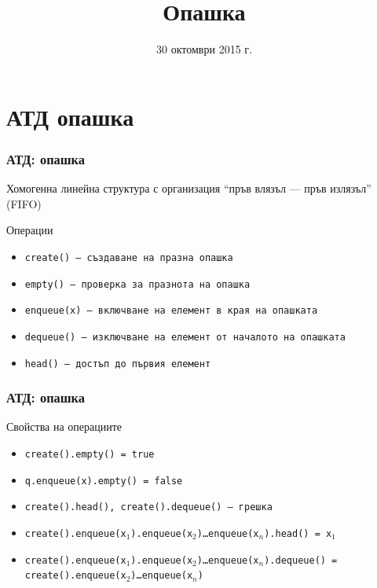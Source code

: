 \documentclass{beamer}
\title{Опашка}
\date{30 октомври 2015 г.}
\begin{document}
\begin{frame}
  \titlepage
\end{frame}

\section{АТД опашка}

\begin{frame}
  \frametitle{АТД: опашка}

  Хомогенна линейна структура с организация ``пръв влязъл --- пръв излязъл'' (FIFO)
  \vspace{1em}

  Операции
  \vspace{0.5em}
  \begin{itemize}
  \item \tt{create()} --- създаване на празна опашка
  \item \tt{empty()} --- проверка за празнота на опашка
  \item \tt{enqueue(x)} --- включване на елемент в края на опашката
  \item \tt{dequeue()} --- изключване на елемент от началото на опашката
  \item \tt{head()} --- достъп до първия елемент
  \end{itemize}
\end{frame}

\begin{frame}
  \frametitle{АТД: опашка}

  Свойства на операциите
  \vspace{0.5em}

  \small
  \begin{itemize}
  \item \tt{create().empty()} = \tt{true}
  \item \tt{q.enqueue(x).empty()} = \tt{false}
  \item \tt{create().head()}, \tt{create().dequeue()} --- \alert{грешка}
  \item \tt{create().enqueue(x$_1$).enqueue(x$_2$)\ldots{}enqueue(x$_n$).head() = x$_1$}
  \item \tt{create().enqueue(x$_1$).enqueue(x$_2$)\ldots{}enqueue(x$_n$).dequeue() = create().enqueue(x$_2$)\ldots{}enqueue(x$_n$)}
  \end{itemize}

\end{frame}
\end{document}
